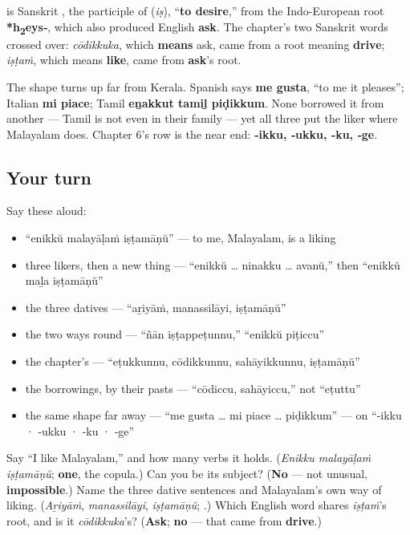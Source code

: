 \begin{cousinweb}
\textbf{} is Sanskrit \textbf{}, the participle of \textbf{} (\emph{iṣ}), \textquotedblleft{}\textbf{to desire},\textquotedblright{} from the Indo-European root \textbf{*h\textsubscript{2}eys‑}, which also produced English \textbf{ask}. The chapter's two Sanskrit words crossed over: \emph{cōdikkuka}, which \textbf{means} ask, came from a root meaning \textbf{drive}; \emph{iṣṭaṁ}, which means \textbf{like}, came from \textbf{ask}'s root.

The shape turns up far from Kerala. Spanish says \textbf{me gusta}, \textquotedblleft{}to me it pleases\textquotedblright{}; Italian \textbf{mi piace}; Tamil \textbf{eṉakkut tamiḻ piḍikkum}. None borrowed it from another — Tamil is not even in their family — yet all three put the liker where Malayalam does. Chapter 6's row is the near end: \textbf{‑ikku, ‑ukku, ‑ku, ‑ge}.
\end{cousinweb}

\subsection*{Your turn}
Say these aloud:

\begin{itemize}
\raggedright
  \item \textquotedblleft{}enikkŭ malayāḷaṁ iṣṭamāṇŭ\textquotedblright{} — to me, Malayalam, is a liking
  \item three likers, then a new thing — \textquotedblleft{}enikkŭ … ninakku … avanŭ,\textquotedblright{} then \textquotedblleft{}enikkŭ maḻa iṣṭamāṇŭ\textquotedblright{}
  \item the three datives — \textquotedblleft{}aṟiyāṁ, manassilāyi, iṣṭamāṇŭ\textquotedblright{}
  \item the two ways round — \textquotedblleft{}ñān iṣṭappeṭunnu,\textquotedblright{} \textquotedblleft{}enikkŭ piṭiccu\textquotedblright{}
  \item the chapter's \textbf{} — \textquotedblleft{}eṭukkunnu, cōdikkunnu, sahāyikkunnu, iṣṭamāṇŭ\textquotedblright{}
  \item the borrowings, by their pasts — \textquotedblleft{}cōdiccu, sahāyiccu,\textquotedblright{} not \textquotedblleft{}eṭuttu\textquotedblright{}
  \item the same shape far away — \textquotedblleft{}me gusta … mi piace … piḍikkum\textquotedblright{} — on \textquotedblleft{}‑ikku · ‑ukku · ‑ku · ‑ge\textquotedblright{}
\end{itemize}

\begin{tcolorbox}[breakable,colback=teal!4,colframe=teal!35!black,title={Before you move on}]
Say \textquotedblleft{}I like Malayalam,\textquotedblright{} and how many verbs it holds. (\emph{Enikku malayāḷaṁ iṣṭamāṇŭ}; \textbf{one}, the copula.) Can you be its subject? (\textbf{No} — not unusual, \textbf{impossible}.) Name the three dative sentences and Malayalam's own way of liking. (\emph{Aṟiyāṁ}, \emph{manassilāyi}, \emph{iṣṭamāṇŭ}; \emph{\textbf{}}.) Which English word shares \emph{iṣṭaṁ}'s root, and is it \emph{cōdikkuka}'s? (\textbf{Ask}; \textbf{no} — that came from \textbf{drive}.)
\end{tcolorbox}

